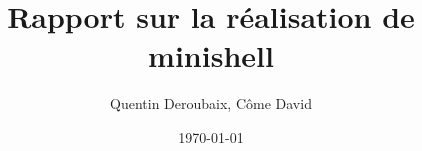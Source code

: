 \documentclass{report}
\begin{document}
\date{\today}

\title{Rapport sur la réalisation de minishell}
\author{Quentin Deroubaix, Côme David}
\maketitle
\tableofcontents

\lipsum
\end{document}
